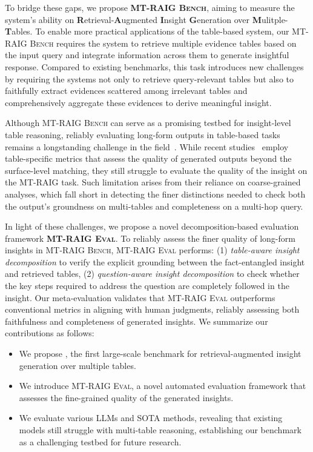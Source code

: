 To bridge these gaps, we propose \textbf{\textsc{MT-RAIG Bench}}, aiming to measure the system’s ability on \textbf{R}etrieval-\textbf{A}ugmented \textbf{I}nsight \textbf{G}eneration over \textbf{M}ulitple-\textbf{T}ables.
To enable more practical applications of the table-based system, our \textsc{MT-RAIG Bench} requires the system to retrieve multiple evidence tables based on the input query and integrate information across them to generate insightful response.
Compared to existing benchmarks, this task introduces new challenges by requiring the systems not only to retrieve query-relevant tables but also to faithfully extract evidences scattered among irrelevant tables and comprehensively aggregate these evidences to derive meaningful insight. 

Although \textsc{MT-RAIG Bench} can serve as a promising testbed for insight-level table reasoning, reliably evaluating long-form outputs in table-based tasks remains a longstanding challenge in the field~\citep{zhao-etal-2024-tapera}.
While recent studies~\citep{zhao-etal-2023-investigating,wang-etal-2024-revisiting} employ table-specific metrics that assess the quality of generated outputs beyond the surface-level matching, they still struggle to evaluate the quality of the insight on the MT-RAIG task.
Such limitation arises from their reliance on coarse-grained analyses, which fall short in detecting the finer distinctions needed to check both the output’s groundness on multi-tables and completeness on a multi-hop query. 


In light of these challenges, we propose a novel decomposition-based evaluation framework \textbf{\textsc{MT-RAIG Eval}}.
To reliably assess the finer quality of long-form insights in \textsc{MT-RAIG Bench}, \textsc{MT-RAIG Eval} performs: (1) \textit{table-aware insight decomposition} to verify the explicit grounding between the fact-entangled insight and retrieved tables, (2) \textit{question-aware insight decomposition} to check whether the key steps required to address the question are completely followed in the insight. 
Our meta-evaluation validates that \textsc{MT-RAIG Eval} outperforms conventional metrics in aligning with human judgments, reliably assessing both faithfulness and completeness of generated insights.
We summarize our contributions as follows:
\begin{itemize}[leftmargin=*,topsep=2pt,itemsep=2pt,parsep=0pt]
    \item We propose \bench, the first large-scale benchmark for retrieval-augmented insight generation over multiple tables.
    \item We introduce \textsc{MT-RAIG Eval}, a novel automated evaluation framework that assesses the fine-grained quality of the generated insights.
    \item We evaluate various LLMs and SOTA methods, revealing that existing models still struggle with multi-table reasoning, establishing our benchmark as a challenging testbed for future research.
\end{itemize}
